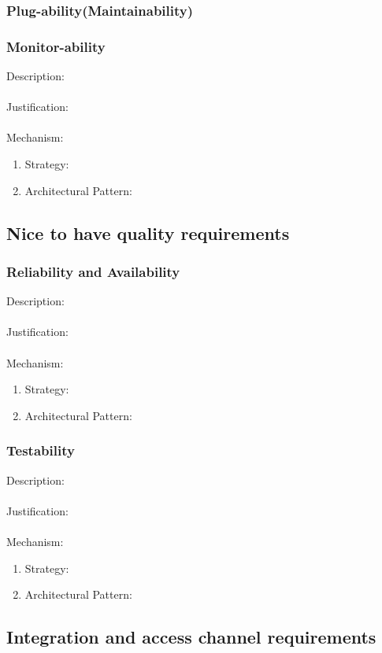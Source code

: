 \documentclass[a4paper,12pt,titlepage]{article}
\begin{document}
\subsubsection{Plug-ability(Maintainability)}%
	
\newpage
\subsubsection{Monitor-ability}%
	Description: \\\\
	Justification: \\\\
	Mechanism:
	\begin{enumerate}
		\item Strategy: 
		\item Architectural Pattern:
	\end{enumerate}
\newpage
\subsection{Nice to have quality requirements}
\subsubsection{Reliability and Availability}%
	Description: \\\\
	Justification: \\\\
	Mechanism:
	\begin{enumerate}
		\item Strategy: 
		\item Architectural Pattern:
	\end{enumerate}
\subsubsection{Testability}%
	Description: \\\\
	Justification: \\\\
	Mechanism:
	\begin{enumerate}
		\item Strategy: 
		\item Architectural Pattern:
	\end{enumerate}
\newpage
\subsection{Integration and access channel requirements}
\newpage
\end{document}
